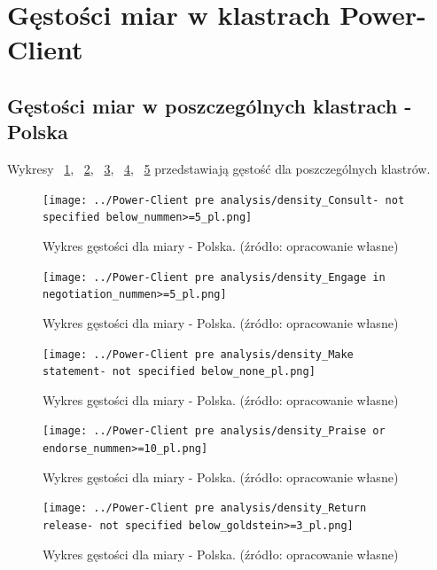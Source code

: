 \documentclass[11pt]{report}
\begin{document}
    \section{Gęstości miar w klastrach Power-Client}

    \subsection{Gęstości miar w poszczególnych klastrach - Polska}\label{subsec:gęstośc-miar-w-poszczególnych-klastrach---polska}
    Wykresy
    ~\ref{fig:density_Consult- not specified below_nummen>=5_pl},
    ~\ref{fig:density_Engage in negotiation_nummen>=5_pl},
    ~\ref{fig:density_Make statement- not specified below_none_pl},
    ~\ref{fig:density_Praise or endorse_nummen>=10_pl},
    ~\ref{fig:density_Return release- not specified below_goldstein>=3_pl}
    przedstawiają gęstość dla poszczególnych klastrów.

    \begin{figure}[!htp]
        \centering
        \texttt{[image: ../Power-Client pre analysis/density\_Consult- not specified below\_nummen>=5\_pl.png]}
        \caption{Wykres gęstości dla miary - Polska. (źródło: opracowanie własne)}
        \label{fig:density_Consult- not specified below_nummen>=5_pl}
    \end{figure}
    \begin{figure}[!htp]
        \centering
        \texttt{[image: ../Power-Client pre analysis/density\_Engage in negotiation\_nummen>=5\_pl.png]}
        \caption{Wykres gęstości dla miary - Polska. (źródło: opracowanie własne)}
        \label{fig:density_Engage in negotiation_nummen>=5_pl}
    \end{figure}
    \begin{figure}[!htp]
        \centering
        \texttt{[image: ../Power-Client pre analysis/density\_Make statement- not specified below\_none\_pl.png]}
        \caption{Wykres gęstości dla miary - Polska. (źródło: opracowanie własne)}
        \label{fig:density_Make statement- not specified below_none_pl}
    \end{figure}
    \begin{figure}[!htp]
        \centering
        \texttt{[image: ../Power-Client pre analysis/density\_Praise or endorse\_nummen>=10\_pl.png]}
        \caption{Wykres gęstości dla miary - Polska. (źródło: opracowanie własne)}
        \label{fig:density_Praise or endorse_nummen>=10_pl}
    \end{figure}
    \begin{figure}[!htp]
        \centering
        \texttt{[image: ../Power-Client pre analysis/density\_Return release- not specified below\_goldstein>=3\_pl.png]}
        \caption{Wykres gęstości dla miary - Polska. (źródło: opracowanie własne)}
        \label{fig:density_Return release- not specified below_goldstein>=3_pl}
    \end{figure}
\end{document}
